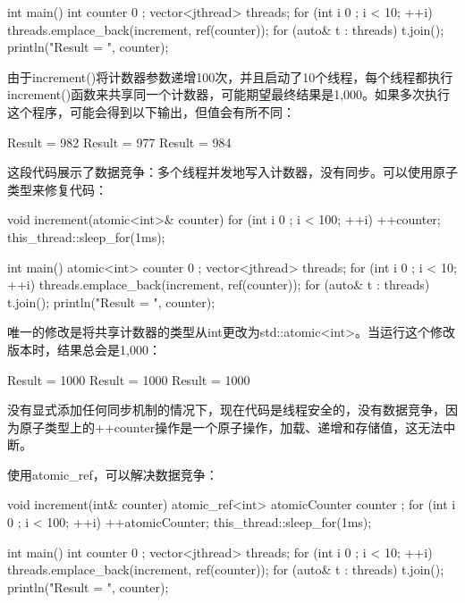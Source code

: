 \begin{cpp}
int main()
{
    int counter { 0 };
    vector<jthread> threads;
    for (int i { 0 }; i < 10; ++i) {
        threads.emplace_back(increment, ref(counter));
    }
    for (auto& t : threads) { t.join(); }
    println("Result = {}", counter);
}
\end{cpp}

由于increment()将计数器参数递增100次，并且启动了10个线程，每个线程都执行increment()函数来共享同一个计数器，可能期望最终结果是1,000。如果多次执行这个程序，可能会得到以下输出，但值会有所不同：

\begin{shell}
Result = 982
Result = 977
Result = 984
\end{shell}

这段代码展示了数据竞争：多个线程并发地写入计数器，没有同步。可以使用原子类型来修复代码：

\begin{cpp}
void increment(atomic<int>& counter)
{
    for (int i { 0 }; i < 100; ++i) {
        ++counter;
        this_thread::sleep_for(1ms);
    }
}

int main()
{
    atomic<int> counter { 0 };
    vector<jthread> threads;
    for (int i { 0 }; i < 10; ++i) {
        threads.emplace_back(increment, ref(counter));
    }
    for (auto& t : threads) { t.join(); }
    println("Result = {}", counter);
}
\end{cpp}

唯一的修改是将共享计数器的类型从int更改为std::atomic<int>。当运行这个修改版本时，结果总会是1,000：

\begin{shell}
Result = 1000
Result = 1000
Result = 1000
\end{shell}

没有显式添加任何同步机制的情况下，现在代码是线程安全的，没有数据竞争，因为原子类型上的++counter操作是一个原子操作，加载、递增和存储值，这无法中断。

使用atomic\_ref，可以解决数据竞争：

\begin{cpp}
void increment(int& counter)
{
    atomic_ref<int> atomicCounter { counter };
    for (int i { 0 }; i < 100; ++i) {
        ++atomicCounter;
        this_thread::sleep_for(1ms);
    }
}

int main()
{
    int counter { 0 };
    vector<jthread> threads;
    for (int i { 0 }; i < 10; ++i) {
        threads.emplace_back(increment, ref(counter));
    }
    for (auto& t : threads) { t.join(); }
    println("Result = {}", counter);
}
\end{cpp}

